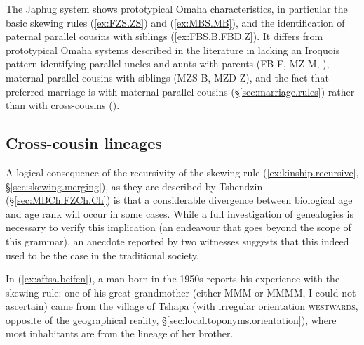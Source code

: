 
The Japhug system shows prototypical Omaha characteristics, in particular the basic skewing rules  (\ref{ex:FZS.ZS}) and (\ref{ex:MBS.MB}), and the identification of paternal parallel cousins with siblings (\ref{ex:FBS.B.FBD.Z}). It differs from prototypical Omaha systems described in the literature in lacking an Iroquois pattern identifying parallel uncles and aunts with parents (FB \fl{} F, MZ \fl{} M, \citealt[34]{trautmann12crossness}), maternal parallel cousins with siblings (MZS \fl{} B, MZD \fl{} Z), and the fact that preferred marriage is with maternal parallel cousins (§\ref{sec:marriage.rules}) rather than with cross-cousins (\citealt[41]{trautmann12crossness}).
 

 \subsection{Cross-cousin lineages} \label{sec:MBChCh.Dpalcan}
A logical consequence of the recursivity of the skewing rule (\ref{ex:kinship.recursive}, §\ref{sec:skewing.merging}), as they are described by Tshendzin (§\ref{sec:MBCh.FZCh.Ch}) is that a considerable divergence between biological age and age rank will occur in some cases. While a full investigation of genealogies is necessary to verify this implication (an endeavour that goes beyond the scope of this grammar), an  anecdote reported by two witnesses suggests that this indeed used to be the case in the traditional society.

In (\ref{ex:aftsa.beifen}), a man born in the 1950s reports his experience with the skewing rule: one of his great-grandmother (either MMM or MMMM, I could not ascertain) came from the village of Tshapa (with irregular orientation \textsc{westwards}, opposite of the geographical reality, §\ref{sec:local.toponyms.orientation}), where most inhabitants are from the lineage of her brother.

